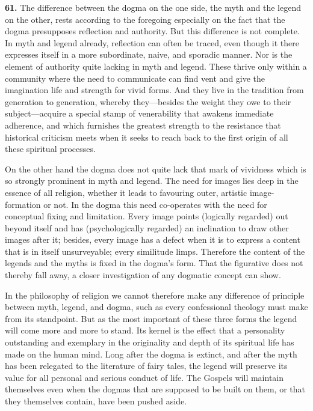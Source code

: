 \documentclass[12pt,a4paper]{book}
\newcommand{\opage}[1]{\marginnote{\footnotesize\textit{[#1]}}}
\begin{document}
\noindent\textbf{61.} The difference between the dogma on the one side, the myth and the legend on the
other, rests according to the foregoing especially on the fact that the dogma presupposes reflection
and authority. But this difference is not complete. In myth and legend already, reflection can often be
traced, even though it there expresses itself in a 
\opage{137}more subordinate, naive, and sporadic manner. Nor is
the element of authority quite lacking in myth and legend. These thrive only within a community where
the need to communicate can find vent and give the imagination life and strength for vivid forms. And
they live in the tradition from generation to generation, whereby they---besides the weight they owe to
their subject---acquire a special stamp of venerability that awakens immediate adherence, and which
furnishes the greatest strength to the resistance that historical criticism meets when it seeks to reach
back to the first origin of all these spiritual processes.

On the other hand the dogma does not quite lack that mark of vividness which is so strongly prominent
in myth and legend. The need for images lies deep in the essence of all religion, whether it leads to
favouring outer, artistic image-formation or not. In the dogma this need co-operates with the need for
conceptual fixing and limitation. Every image points (logically regarded) out beyond itself and has
(psychologically regarded) an inclination to draw other images after it; besides, every image has a
defect when it is to express a content that is in itself unsurveyable; every similitude limps. Therefore
the content of the legends and the myths is fixed in the dogma's form. That the figurative does not
thereby fall away, a closer investigation of any dogmatic concept can show.

In the philosophy of religion we cannot therefore make any difference of principle between myth, legend,
and dogma, such as every confessional theology must make from its standpoint. But as the most important
of these three forms the legend will come more and more to stand. Its kernel is the effect that a
personality outstanding and exemplary in the originality and depth of its spiritual life has made on the
human mind. Long after the dogma is extinct, and after the myth has been relegated to the literature of
fairy tales, the legend will preserve its value for all personal and serious conduct of life. The
Gospels will maintain themselves even when the dogmas that are supposed to be built on them, or that
they themselves contain, have been pushed aside.
\end{document}
